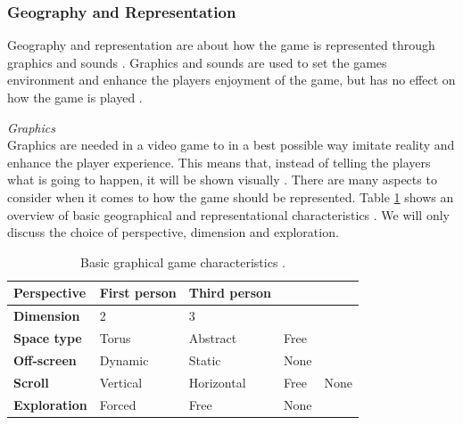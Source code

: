 \subsubsection{Geography and Representation}
\label{sec:georep}
Geography and representation are about how the game is represented through graphics and sounds \cite{understandingvg}. Graphics and sounds are used to set the games environment and enhance the players enjoyment of the game, but has no effect on how the game is played \cite{umlapproach}.  

\emph{Graphics}\\
Graphics are needed in a video game to in a best possible way imitate reality and enhance the player experience. This means that, instead of telling the players what is going to happen, it will be shown visually \cite{umlapproach}.
There are many aspects to consider when it comes to how the game should be represented. Table \ref{tab:graphic} shows an overview of basic geographical and representational characteristics \cite{understandingvg}. We will only discuss the choice of perspective, dimension and exploration. 

\begin{table}
\centering
    \begin{tabular}{|l|l|l|l|l|}
        \hline
       \textbf{Perspective} & First person & Third person & &  \\ \hline
       \textbf{Dimension} & 2 & 3 & & \\ \hline
       \textbf{Space type} & Torus & Abstract & Free & \\ \hline
	   \textbf{Off-screen} & Dynamic & Static & None & \\ \hline
	   \textbf{Scroll} & Vertical & Horizontal & Free & None \\ \hline
	   \textbf{Exploration} & Forced & Free & None & \\
        \hline
    \end{tabular}
    \caption[Graphical Characteristics]{Basic graphical game characteristics \cite{understandingvg}.}
    \label{tab:graphic}
\end{table} 

